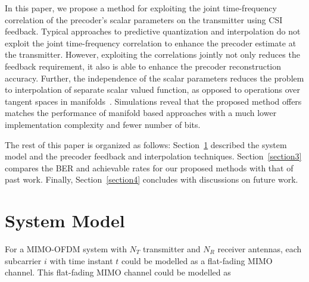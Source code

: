\documentclass[conference]{IEEEtran}
\begin{document}
In this paper, we propose a method for exploiting the joint time-frequency correlation of the precoder's scalar parameters on the transmitter using CSI feedback. Typical approaches to predictive quantization and interpolation do not exploit the joint time-frequency correlation to enhance the precoder estimate at the transmitter. However, exploiting the correlations jointly not only reduces the feedback requirement, it also is able to enhance the precoder reconstruction accuracy. Further, the independence of the scalar parameters reduces the problem to interpolation of separate scalar valued function, as opposed to operations over tangent spaces in manifolds~\cite{Gupt1905:Predictive}. Simulations reveal that the proposed method offers matches the performance of manifold based approaches with a much lower implementation complexity and fewer number of bits.


The rest of this paper is organized as follows: Section~\ref{section2} described the system model and the precoder feedback and interpolation techniques. Section~\ref{section3} compares the BER and achievable rates for our proposed methods with that of past work. Finally, Section~\ref{section4} concludes with discussions on future work.





\section{System Model}

\label{section2}

For a MIMO-OFDM system with $N_T$ transmitter and $N_R$ receiver antennas, each subcarrier $i$ with time instant $t$ could be modelled as a flat-fading MIMO channel. This flat-fading MIMO channel could be modelled as
\end{document}

